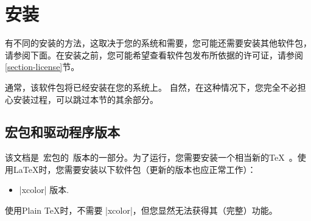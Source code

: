 %
%
%


\section{安装}


有不同的安装\pgfname 的方法，这取决于您的系统和需要，您可能还需要安装其他软件包，请参阅下面。在安装之前，您可能希望查看软件包发布所依据的许可证，请参阅\ref{section-license}节。


通常，该软件包将已经安装在您的系统上。 自然，在这种情况下，您完全不必担心安装过程，可以跳过本节的其余部分。


\subsection{宏包和驱动程序版本}


该文档是\pgfname\ 宏包的\pgfversion\ 版本的一部分。为了运行\pgfname，您需要安装一个相当新的\TeX\ 。使用\LaTeX 时，您需要安装以下软件包（更新的版本也应正常工作）：

%
\begin{itemize}
    \item |xcolor| \xcolorversion 版本.
\end{itemize}
%
%
使用Plain \TeX 时，不需要 |xcolor|，但您显然无法获得其（完整）功能。

